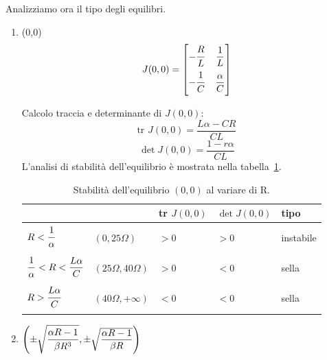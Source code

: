 \documentclass[11pt, a4paper]{article}
\begin{document}
Analizziamo ora il tipo degli equilibri.
\begin{enumerate}
\item (0,0)\\
\begin{equation}
    J(0,0) =
    \begin{bmatrix}
    -\dfrac{\strut R}{L\strut} & \dfrac{1}{L} \\
    -\dfrac{\strut 1}{C\strut} & \dfrac{\alpha}{C} \\
    \end{bmatrix}
\end{equation}

Calcolo traccia e determinante di $J(0,0)$:
\begin{equation}
\textrm{tr } J(0,0) = \frac{L\alpha-CR}{CL}
\end{equation}
\begin{equation}
\det J(0,0) = \frac{1-r\alpha}{CL}
\end{equation}
L'analisi di stabilità dell'equilibrio è mostrata nella tabella~\ref{stab-00}.

\begin{table}[h]
    \begin{center}
    \begin{tabular}{l l l l l}
        & & tr $J(0,0)$ & $\det J(0,0)$ & tipo\\
        \hline
        $R<\dfrac{1\strut}{\alpha\strut}$ & $(0, 25 \Omega)$ & $>0$ & $>0$ & instabile \\
        \hline
        $\dfrac{1\strut}{\alpha\strut}<R<\dfrac{L\alpha}{C}$ & $(25 \Omega, 40 \Omega)$ & $>0$ & $<0$ & sella \\
        \hline
        $R>\dfrac{L\alpha\strut}{C\strut}$ & $(40 \Omega, +\infty)$ & $<0$ & $<0$ & sella \\
        \hline
    \end{tabular}
    \caption{Stabilità dell'equilibrio $(0,0)$ al variare di R.}
    \label{stab-00}
    \end{center}
\end{table}

\item $\left( \pm \sqrt{\dfrac{\strut\alpha R -1}{\strut\beta R^3}}, \pm \sqrt{\dfrac{\alpha R -1}{\beta R}} \right)$


\end{enumerate}
\end{document}
